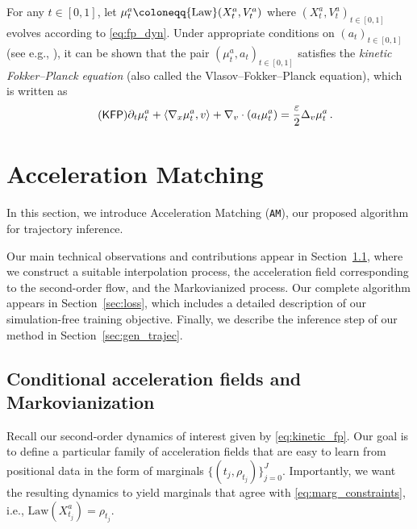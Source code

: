 \documentclass[12pt]{article}
\theoremstyle{plain}
\theoremstyle{plain}
\theoremstyle{remark}
\newcommand*{\defeq}{\coloneqq}
\newcommand{\msf}[1]{\mathsf{#1}}
\newcommand{\eps}{\varepsilon}
\newcommand{\1}{\bm{1}}
\theoremstyle{plain}
\theoremstyle{definition}
\theoremstyle{remark}
\begin{document}
For any $t\in [0,1]$, let $\mu_t^a \defeq {\rm Law}(X_t^a,V_t^a)$ where $(X_t^a,V_t^a)_{t\in[0,1]}$ evolves according to \eqref{eq:fp_dyn}. Under appropriate conditions on $(a_t)_{t\in[0,1]}$ (see e.g., \cite{bogachev2022fokker}), it can be shown that the pair $(\mu_t^a,a_t)_{t\in[0,1]}$ satisfies the \emph{kinetic Fokker--Planck equation} (also called the Vlasov--Fokker--Planck equation), which is written as
\begin{align}\label{eq:kinetic_fp}\tag{$\msf{KFP}$}
\begin{split}
&\partial_t \mu_t^a + \langle \nabla_x \mu_t^a, v \rangle + \nabla_v \cdot(a_t \mu_t^a) = \frac{\eps}{2}\Delta_v \mu_t^a\,.
\end{split}
\end{align}



\section{Acceleration Matching}\label{sec:main}
In this section, we introduce Acceleration Matching (\texttt{AM}), our proposed algorithm for trajectory inference.

Our main technical observations and contributions appear in Section~\ref{sec:condacc}, where we construct a suitable interpolation process, the acceleration field corresponding to the second-order flow, and the Markovianized process. Our complete algorithm appears in Section~\ref{sec:loss}, which includes a detailed description of our simulation-free training objective. Finally, we describe the inference step of our method in Section~\ref{sec:gen_trajec}.

\subsection{Conditional acceleration fields and Markovianization}\label{sec:condacc}
Recall our second-order dynamics of interest given by \eqref{eq:kinetic_fp}.
Our goal is to define a particular family of acceleration fields that are easy to learn from positional data in the form of marginals $\{(t_j, \rho_{t_j})\}_{j=0}^J$. Importantly, we want the resulting dynamics to yield marginals that agree with \eqref{eq:marg_constraints}, i.e., $\mathrm{Law} (X_{t_j}^a) = \rho_{t_j}$.
\end{document}
